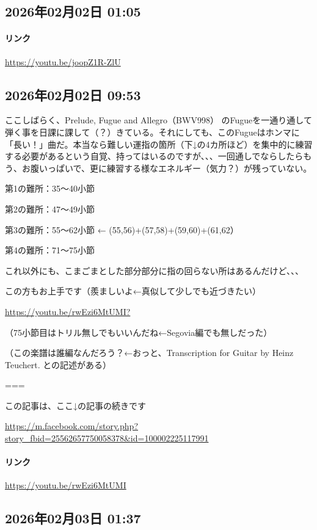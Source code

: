 \subsection*{2026年02月02日 01:05}

\paragraph{リンク}
\url{https://youtu.be/joopZ1R-ZlU}

\subsection*{2026年02月02日 09:53}

ここしばらく、Prelude, Fugue and Allegro（BWV998） のFugueを一通り通して弾く事を日課に課して（？）きている。それにしても、このFugueはホンマに「長い！」曲だ。本当なら難しい運指の箇所（下↓の4カ所ほど）を集中的に練習する必要があるという自覚、持ってはいるのですが、、、一回通しでならしたらもう、お腹いっぱいで、更に練習する様なエネルギー（気力？）が残っていない。

第1の難所：35〜40小節

第2の難所：47〜49小節

第3の難所：55〜62小節 ← (55,56)+(57,58)+(59,60)+(61,62）

第4の難所：71〜75小節

これ以外にも、こまごまとした部分部分に指の回らない所はあるんだけど、、、

この方もお上手です（羨ましいよ←真似して少しでも近づきたい）

\url{https://youtu.be/rwEzi6MtUMI?}

（75小節目はトリル無しでもいいんだね←Segovia編でも無しだった）

（この楽譜は誰編なんだろう？←おっと、Transcription for  Guitar by Heinz Teuchert. との記述がある）

===

この記事は、ここ↓の記事の続きです

\url{https://m.facebook.com/story.php?story_fbid=25562657750058378&id=100002225117991}

\paragraph{リンク}
\url{https://youtu.be/rwEzi6MtUMI}

\subsection*{2026年02月03日 01:37}

